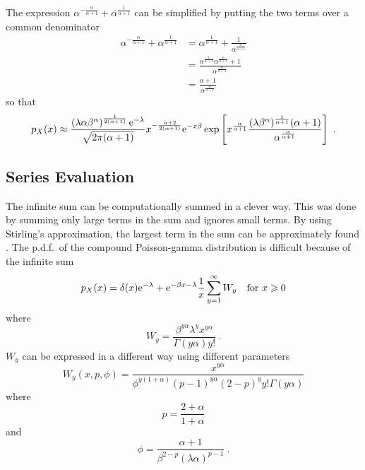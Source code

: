 The expression $\alpha^{-\frac{\alpha}{\alpha+1}}+\alpha^{\frac{1}{\alpha+1}}$ can be simplified by putting the two terms over a common denominator
\begin{align}
  \alpha^{-\frac{\alpha}{\alpha+1}}+\alpha^{\frac{1}{\alpha+1}}
  & = \alpha^{\frac{1}{\alpha+1}}+\frac{1}{\alpha^{\frac{\alpha}{\alpha+1}}}
  \nonumber\\
  & = \frac{\alpha^{\frac{1}{\alpha+1}}\alpha^{\frac{\alpha}{\alpha+1}}+1}{\alpha^{\frac{\alpha}{\alpha+1}}}
  \nonumber\\
  & = \frac{\alpha+1}{\alpha^{\frac{\alpha}{\alpha+1}}}
\end{align}
so that
\begin{equation*}
p_X(x)\approx
  \frac{
    \left(\lambda\alpha\beta^\alpha\right)^{\frac{1}{2(\alpha+1)}}\mathrm{e}^{-\lambda}
  }
  {
    \sqrt{2\pi(\alpha+1)}
  }
  x^{-\frac{\alpha+2}{2(\alpha+1)}}
  \mathrm{e}^{-x\beta}
  \exp\left[
    x^{\frac{\alpha}{\alpha+1}}
    \frac{(\lambda\beta^\alpha)^{\frac{1}{\alpha+1}}(\alpha+1)}{\alpha^{\frac{\alpha}{\alpha+1}}}
  \right]
  \ .
\end{equation*}

\subsection{Series Evaluation}

The infinite sum can be computationally summed in a clever way. This was done by summing only large terms in the sum and ignores small terms. By using Stirling's approximation, the largest term in the sum can be approximately found \citep{dunn2005series}. The p.d.f.~of the compound Poisson-gamma distribution is difficult because of the infinite sum
\begin{equation}
p_X(x) = 
  \delta(x) \mathrm{e}^{-\lambda}
  +
  \mathrm{e}^{-\beta x-\lambda}\frac{1}{x}\sum_{y=1}^{\infty}W_y
  \quad\text{for }x\geqslant 0
\end{equation}
where
\begin{equation}
  W_y = \frac{\beta^{y\alpha}\lambda^yx^{y\alpha}}{\Gamma(y\alpha)y!}
  \ .
  \label{eq:compoundPoisson_Wy}
\end{equation}
$W_y$ can be expressed in a different way using different parameters
\begin{equation}
  W_y(x,p,\phi)=\frac{x^{y\alpha}}{\phi^{y(1+\alpha)}(p-1)^{y\alpha}(2-p)^yy!\Gamma(y\alpha)}
\end{equation}
where
\begin{equation}
  p=\frac{2+\alpha}{1+\alpha}
\end{equation}
and
\begin{equation}
  \phi = \frac{\alpha+1}{\beta^{2-p}(\lambda\alpha)^{p-1}} \ .
\end{equation}

